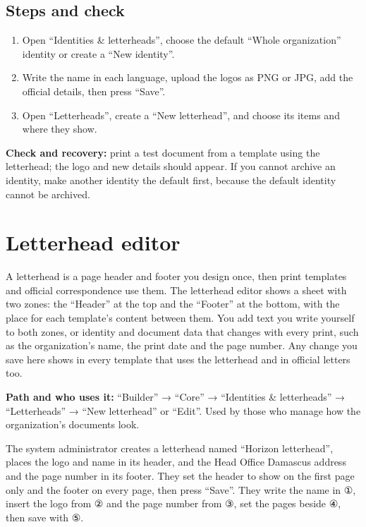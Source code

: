 \subsection{Steps and check}
\begin{enumerate}
\item Open “Identities \& letterheads”, choose the default “Whole organization” identity or create a “New identity”.
\item Write the name in each language, upload the logos as PNG or JPG, add the official details, then press “Save”.
\item Open “Letterheads”, create a “New letterhead”, and choose its items and where they show.
\end{enumerate}

\textbf{Check and recovery:} print a test document from a template using the letterhead; the logo and new details should appear. If you cannot archive an identity, make another identity the default first, because the default identity cannot be archived.

\clearpage
\section{Letterhead editor}
\label{sec:builder-feature-letterheads}

A letterhead is a page header and footer you design once, then print templates and official correspondence use them. The letterhead editor shows a sheet with two zones: the “Header” at the top and the “Footer” at the bottom, with the place for each template's content between them. You add text you write yourself to both zones, or identity and document data that changes with every print, such as the organization's name, the print date and the page number. Any change you save here shows in every template that uses the letterhead and in official letters too.

\textbf{Path and who uses it:} “Builder” → “Core” → “Identities \& letterheads” → “Letterheads” → “New letterhead” or “Edit”. Used by those who manage how the organization's documents look.

\begin{rcnote}
The system administrator creates a letterhead named “Horizon letterhead”, places the logo and name in its header, and the Head Office Damascus address and the page number in its footer. They set the header to show on the first page only and the footer on every page, then press “Save”. They write the name in ①, insert the logo from ② and the page number from ③, set the pages beside ④, then save with ⑤.
\end{rcnote}

